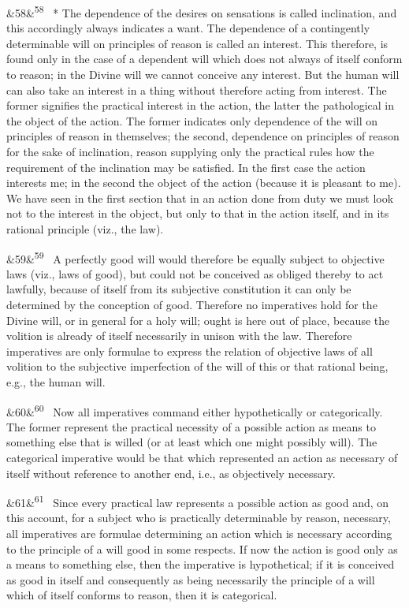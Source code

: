 \documentclass[12pt]{article}
\newcommand{\para}[1][]{\par\noindent\ifx&#1&\else\textsuperscript{\footnotesize #1}~\fi}
\begin{document}
\para[58] * The dependence of the desires on sensations is called inclination, and this accordingly always indicates a want. The dependence of a contingently determinable will on principles of reason is called an interest. This therefore, is found only in the case of a dependent will which does not always of itself conform to reason; in the Divine will we cannot conceive any interest. But the human will can also take an interest in a thing without therefore acting from interest. The former signifies the practical interest in the action, the latter the pathological in the object of the action. The former indicates only dependence of the will on principles of reason in themselves; the second, dependence on principles of reason for the sake of inclination, reason supplying only the practical rules how the requirement of the inclination may be satisfied. In the first case the action interests me; in the second the object of the action (because it is pleasant to me). We have seen in the first section that in an action done from duty we must look not to the interest in the object, but only to that in the action itself, and in its rational principle (viz., the law).

\para[59] A perfectly good will would therefore be equally subject to objective laws (viz., laws of good), but could not be conceived as obliged thereby to act lawfully, because of itself from its subjective constitution it can only be determined by the conception of good. Therefore no imperatives hold for the Divine will, or in general for a holy will; ought is here out of place, because the volition is already of itself necessarily in unison with the law. Therefore imperatives are only formulae to express the relation of objective laws of all volition to the subjective imperfection of the will of this or that rational being, e.g., the human will.

\para[60] Now all imperatives command either hypothetically or categorically. The former represent the practical necessity of a possible action as means to something else that is willed (or at least which one might possibly will). The categorical imperative would be that which represented an action as necessary of itself without reference to another end, i.e., as objectively necessary.

\para[61] Since every practical law represents a possible action as good and, on this account, for a subject who is practically determinable by reason, necessary, all imperatives are formulae determining an action which is necessary according to the principle of a will good in some respects. If now the action is good only as a means to something else, then the imperative is hypothetical; if it is conceived as good in itself and consequently as being necessarily the principle of a will which of itself conforms to reason, then it is categorical.
\end{document}

